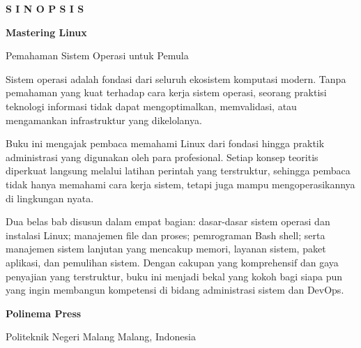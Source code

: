 
\begin{titlepage}
\thispagestyle{empty}


\vspace*{1.6cm}

{\small\sffamily\bfseries S I N O P S I S\par}
\vspace{0.45cm}
{\Large\bfseries Mastering Linux\par}
{\normalsize Pemahaman Sistem Operasi untuk Pemula\par}

\vspace{0.9cm}

\begin{tcolorbox}[
    enhanced,
    colback=white,
    colframe=black!45,
    boxrule=0.5pt,
    arc=1.5pt,
    left=10pt,
    right=10pt,
    top=10pt,
    bottom=10pt
]
Sistem operasi adalah fondasi dari seluruh ekosistem komputasi modern. Tanpa pemahaman yang kuat terhadap cara kerja sistem operasi, seorang praktisi teknologi informasi tidak dapat mengoptimalkan, memvalidasi, atau mengamankan infrastruktur yang dikelolanya.

\vspace{0.5cm}

Buku ini mengajak pembaca memahami Linux dari fondasi hingga praktik administrasi yang digunakan oleh para profesional. Setiap konsep teoritis diperkuat langsung melalui latihan perintah yang terstruktur, sehingga pembaca tidak hanya memahami cara kerja sistem, tetapi juga mampu mengoperasikannya di lingkungan nyata.

\vspace{0.5cm}

Dua belas bab disusun dalam empat bagian: dasar-dasar sistem operasi dan instalasi Linux; manajemen file dan proses; pemrograman Bash shell; serta manajemen sistem lanjutan yang mencakup memori, layanan sistem, paket aplikasi, dan pemulihan sistem. Dengan cakupan yang komprehensif dan gaya penyajian yang terstruktur, buku ini menjadi bekal yang kokoh bagi siapa pun yang ingin membangun kompetensi di bidang administrasi sistem dan DevOps.
\end{tcolorbox}

\vfill

\begin{center}
    {\normalsize\bfseries Polinema Press\par}
    {\small Politeknik Negeri Malang \textbullet{} Malang, Indonesia\par}
\end{center}

\end{titlepage}
